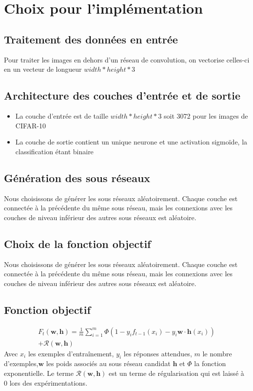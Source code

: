 \documentclass[11 pt]{article}
\begin{document}
\section{Choix pour l'implémentation}
\subsection{Traitement des données en entrée}
Pour traiter les images en dehors d'un réseau de convolution, on vectorise celles-ci en un vecteur de longueur $width*height*3$

\subsection{Architecture des couches d'entrée et de sortie}
\begin{itemize}
	\item La couche d'entrée est de taille $width*height*3$ soit 3072 pour les images de CIFAR-10
	\item La couche de sortie contient un unique neurone et une activation sigmoïde, la classification étant binaire
\end{itemize}

\subsection{Génération des sous réseaux}
Nous choisissons de générer les sous réseaux aléatoirement. Chaque couche est connectée à la précédente du même sous réseau, mais les connexions avec les couches de niveau inférieur des autres sous réseaux est aléatoire. 

\subsection{Choix de la fonction objectif}

Nous choisissons de générer les sous réseaux aléatoirement. Chaque couche est connectée à la précédente du même sous réseau, mais les connexions avec les couches de niveau inférieur des autres sous réseaux est aléatoire. 

\subsection{Fonction objectif}
\label{subsec:fobj}
\begin{multline*}
F_t(\mathbf{w,h})=\frac{1}{m}\sum^m_{i=1}\Phi(1-y_if_{t-1}(x_i)-y_i\mathbf{w\cdot h}(x_i))\\
+ \mathcal{R}(\mathbf{w,h})
\end{multline*}
Avec $x_i$ les exemples d'entraînement, $y_i$ les réponses attendues, $m$ le nombre d'exemples,$\mathbf{w}$ les poids associés au sous réseau candidat $\mathbf{h}$ et $\Phi$ la fonction exponentielle. Le terme $\mathcal{R}(\mathbf{w,h})$ est un terme de régularisation qui est laiss\'e à $0$ lors des expérimentations.
\end{document}
